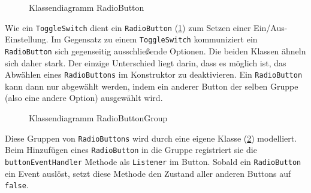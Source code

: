 		\medskip
		\begin{figure}
			\caption{Klassendiagramm RadioButton}
			\label{uml-radiobutton}
		\end{figure}
		Wie ein \texttt{ToggleSwitch} dient ein \texttt{RadioButton} (\ref{uml-radiobutton}) zum Setzen einer Ein/Aus-Einstellung.
		Im Gegensatz zu einem \texttt{ToggleSwitch} kommuniziert ein \texttt{RadioButton} sich gegenseitig ausschließende Optionen.
		Die beiden Klassen ähneln sich daher stark. Der einzige Unterschied liegt darin, dass es möglich ist, das Abwählen eines
		\texttt{RadioButtons} im Konstruktor zu deaktivieren. Ein \texttt{RadioButton} kann dann nur abgewählt werden,
		indem ein anderer Button der selben Gruppe (also eine andere Option) ausgewählt wird.
		
		\medskip
		\begin{figure}
			\scalebox{0.75}{
				\begin{tikzpicture}
					
				\end{tikzpicture}
			}
			\label{uml-radiogroup}
			\caption{Klassendiagramm RadioButtonGroup}
		\end{figure}
		Diese Gruppen von \texttt{RadioButtons} wird durch eine eigene Klasse (\ref{uml-radiogroup}) modelliert.
		Beim Hinzufügen eines \texttt{RadioButton} in die Gruppe registriert sie die \texttt{buttonEventHandler} Methode als \texttt{Listener} im Button.
		Sobald ein \texttt{RadioButton} ein Event auslöst, setzt diese Methode den Zustand aller anderen Buttons auf \texttt{false}.
		
